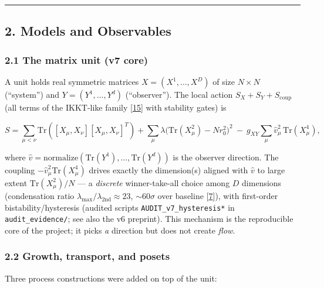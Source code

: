 \begin{center}\rule{0.5\linewidth}{0.5pt}\end{center}

\subsection{2. Models and Observables}\label{models-and-observables}

\subsubsection{2.1 The matrix unit (v7
core)}\label{the-matrix-unit-v7-core}

A unit holds real symmetric matrices \(X = (X^1,\dots,X^D)\) of size
\(N\times N\) (``system'') and \(Y = (Y^1,\dots,Y^d)\) (``observer'').
The local action \(S_X + S_Y + S_{\mathrm{coup}}\) (all terms of the
IKKT-like family {[}\hyperref[ref-15]{15}{]} with stability gates) is

\[S = \sum_{\mu<\nu}\mathrm{Tr}([X_\mu,X_\nu][X_\mu,X_\nu]^T) + \sum_\mu \lambda\big(\mathrm{Tr}(X_\mu^2)-Nr_0^2\big)^2 \ -\ g_{XY}\sum_\mu \hat v_\mu^2\,\mathrm{Tr}(X_\mu^4),\]

where
\(\hat v = \mathrm{normalize}(\mathrm{Tr}(Y^1),\dots,\mathrm{Tr}(Y^d))\)
is the observer direction. The coupling
\(-\hat v_\mu^2\mathrm{Tr}(X_\mu^4)\) drives exactly the dimension(s)
aligned with \(\hat v\) to large extent \(\mathrm{Tr}(X_\mu^2)/N\) --- a
\emph{discrete} winner-take-all choice among \(D\) dimensions
(condensation ratio \(\lambda_{\max}/\lambda_{2\mathrm{nd}}\approx 23\),
\(\sim 60\sigma\) over baseline {[}\hyperref[ref-7]{7}{]}), with
first-order bistability/hysteresis (audited scripts
\texttt{AUDIT\_v7\_hysteresis*} in \texttt{audit\_evidence/}; see also
the v6 preprint). This mechanism is the reproducible core of the
project; it picks \emph{a} direction but does not create \emph{flow}.

\subsubsection{2.2 Growth, transport, and
posets}\label{growth-transport-and-posets}

Three process constructions were added on top of the unit:

